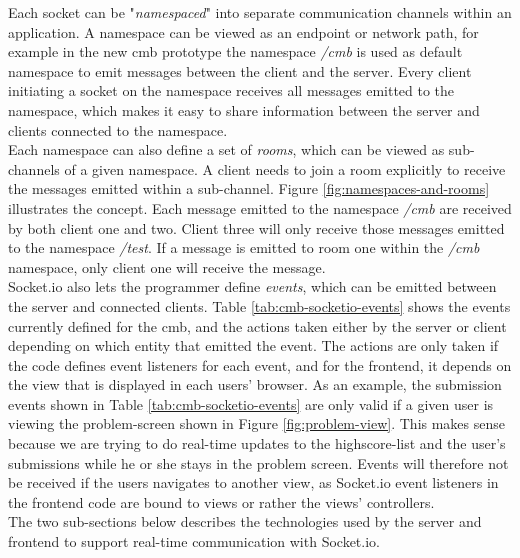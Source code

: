 Each socket can be "\textit{namespaced}"  into separate communication channels within an application. A namespace can be viewed as an endpoint or network path, for example in the new \gls{cmb} prototype the namespace \textit{/cmb} is used as default namespace to emit messages between the client and the server. Every client initiating a socket on the namespace receives all messages emitted to the namespace, which makes it easy to share information between the server and clients connected to the namespace. \\

Each namespace can also define a set of \textit{rooms}, which can be viewed as sub-channels of a given namespace. A client needs to join a room explicitly to receive the messages emitted within a sub-channel. Figure \ref{fig:namespaces-and-rooms} illustrates the concept. Each message emitted to the namespace \textit{/cmb} are received by both client one and two. Client three will only receive those messages emitted to the namespace \textit{/test}. If a message is emitted to room one within the \textit{/cmb} namespace, only client one will receive the message. \\

Socket.io also lets the programmer define \textit{events}, which can be emitted between the server and connected clients. Table \ref{tab:cmb-socketio-events} shows the events currently defined for the \gls{cmb}, and the actions taken either by the server or client depending on which entity that emitted the event. The actions are only taken if the code defines event listeners for each event, and for the frontend, it depends on the view that is displayed in each users’ browser. As an example, the submission events shown in Table \ref{tab:cmb-socketio-events} are only valid if a given user is viewing the problem-screen shown in Figure \ref{fig:problem-view}. This makes sense because we are trying to do real-time updates to the highscore-list and the user’s submissions while he or she stays in the problem screen. Events will therefore not be received if the users navigates to another view, as Socket.io event listeners in the frontend code are bound to views or rather the views’ controllers.  \\

The two sub-sections below describes the technologies used by the server and frontend  to support real-time communication with Socket.io.

